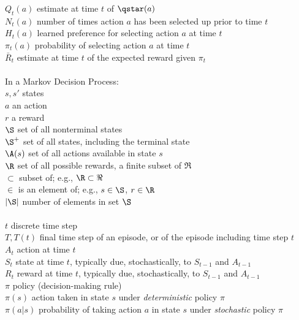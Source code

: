 \begin{tabbing}
\>$Q_t(a)$            \> estimate at time $t$ of $\qstar(a)$\\
\>$N_t(a)$            \> number of times action $a$ has been selected up prior to time $t$\\
\>$H_t(a)$            \> learned preference for selecting action $a$ at time $t$\\
\>$\pi_t(a)$          \> probability of selecting action $a$ at time $t$\\
\>$\bar R_t$          \> estimate at time $t$ of the expected reward given $\pi_t$\\
\\
\>In a Markov Decision Process:\\
\>$s, s'$             \> states\\
\>$a$                 \> an action\\
\>$r$                 \> a reward\\
\>$\S$                \> set of all nonterminal states \\
\>$\S^+$              \> set of all states, including the terminal state \\
\>$\A(s)$             \> set of all actions available in state $s$\\
\>$\R$                \> set of all possible rewards, a finite subset of $\Re$\\
\>$\subset$           \> subset of; e.g., $\R\subset\Re$\\
\>$\in$               \> is an element of; e.g., $s\in\S$, $r\in\R$\\
\>$|\S|$              \> number of elements in set $\S$\\
\\
\>$t$                 \> discrete time step\\
\>$T, T(t)$           \> final time step of an episode, or of the episode including time step $t$\\
\>$A_t$               \> action at time $t$\\
\>$S_t$               \> state at time $t$, typically due, stochastically, to $S_{t-1}$ and $A_{t-1}$\\
\>$R_t$               \> reward at time $t$, typically due, stochastically, to $S_{t-1}$ and $A_{t-1}$\\
\>$\pi$               \> policy (decision-making rule)\\
\>$\pi(s)$            \> action taken in state $s$ under {\it deterministic\/} policy $\pi$\\
\>$\pi(a|s)$          \> probability of taking action $a$ in state $s$ under {\it stochastic\/} policy $\pi$\\

\end{tabbing}
